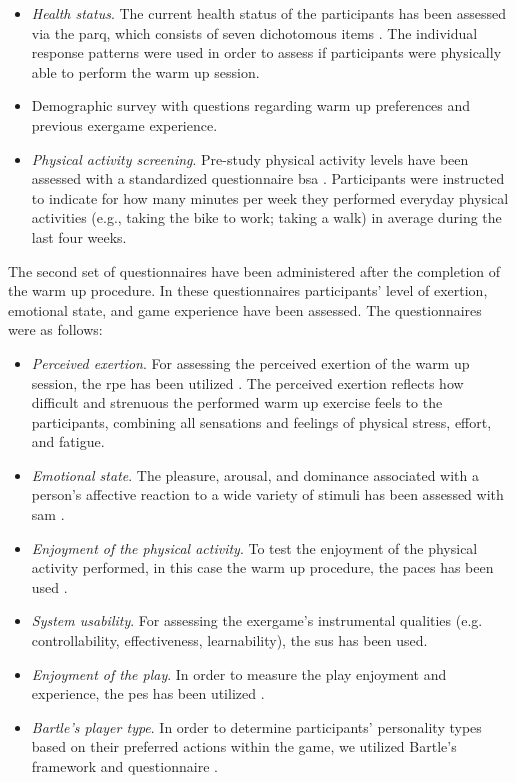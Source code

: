 \begin{itemize}
\item \textit{Health status}. The current health status of the participants has been assessed via the \gls{parq}, which consists of seven dichotomous items \cite{thomas1992revision}. The individual response patterns were used in order to assess if participants were physically able to perform the warm up session. 
\item Demographic survey with questions regarding warm up preferences and previous exergame experience.
\item \textit{Physical activity screening}. Pre-study physical activity levels have been assessed with a standardized questionnaire  \gls{bsa} \cite{fuchs2015messung}. Participants were instructed to indicate for how many minutes per week they performed everyday physical activities (e.g., taking the bike to work; taking a walk) in average during the last four weeks. 
\end{itemize}
The second set of questionnaires have been administered after the completion of the warm up procedure. In these questionnaires participants' level of exertion, emotional state, and game experience have been assessed. The questionnaires were as follows:
\begin{itemize}
\item \textit{Perceived exertion}. For assessing the perceived exertion of the warm up session, the \gls{rpe} has been utilized \cite{borg1998borg}. The perceived exertion reflects how difficult and strenuous the performed warm up exercise feels to the participants, combining all sensations and feelings of physical stress, effort, and fatigue.
\item \textit{Emotional state}. The pleasure, arousal, and dominance associated with a person's affective reaction to a wide variety of stimuli has been assessed with \gls{sam} \cite{bradley1994measuring}. 
\item \textit{Enjoyment of the physical activity}. To test the enjoyment of the physical activity performed, in this case the warm up procedure, the \gls{paces} has been used \cite{kendzierski1991physical}. 
\item \textit{System usability}. For assessing the exergame's instrumental qualities (e.g. controllability, effectiveness, learnability), the \gls{sus} has been used.
\item \textit{Enjoyment of the play}. In order to measure the play enjoyment and experience, the \gls{pes} has been utilized  \cite{pavlas2012play}.
\item \textit{Bartle's player type}. In order to determine participants’ personality types based on their preferred actions within the game, we utilized Bartle's framework and questionnaire \cite{bartle}.
\end{itemize}
